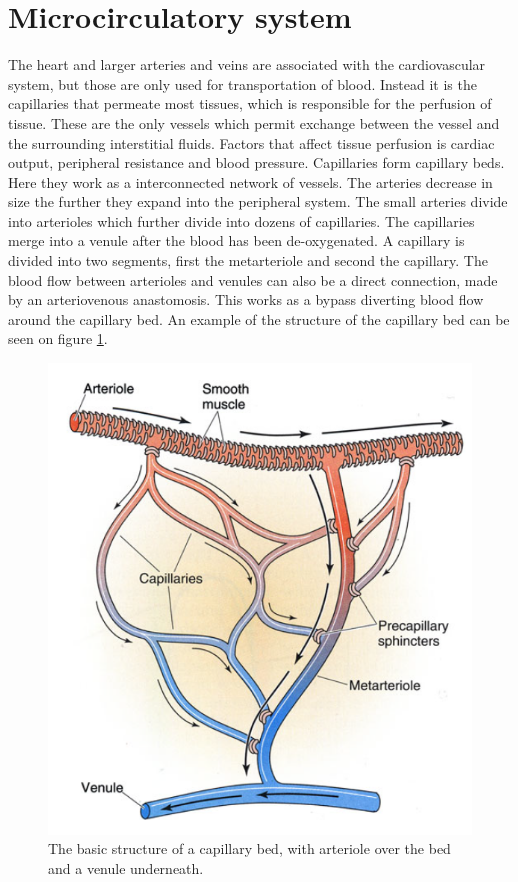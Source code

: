 
\section{Microcirculatory system}

The heart and larger arteries and veins are associated with the cardiovascular system, but those are only used for transportation of blood. Instead it is the capillaries that permeate most tissues, which is responsible for the perfusion of tissue. These are the only vessels which permit exchange between the vessel and the surrounding interstitial fluids. Factors that affect tissue perfusion is cardiac output, peripheral resistance and blood pressure. Capillaries form capillary beds. Here they work as a interconnected network of vessels.
The arteries decrease in size the further they expand into the peripheral system. The small arteries divide into arterioles which further divide into dozens of capillaries. The capillaries merge into a venule after the blood has been de-oxygenated. A capillary is divided into two segments, first the metarteriole and second the capillary. The blood flow between arterioles and venules can also be a direct connection, made by an arteriovenous anastomosis. This works as a bypass diverting blood flow around the capillary bed. An example of the structure of the capillary bed can be seen on figure \ref{fig:beds}.\cite{martini2012}
\begin{figure}[H]                                         
	\includegraphics[width=.6\textwidth]{figures/capillary_bed}  
	\caption{The basic structure of a capillary bed, with arteriole over the bed and a venule underneath.\cite{martini2012}}
	\label{fig:beds}  
\end{figure}          

